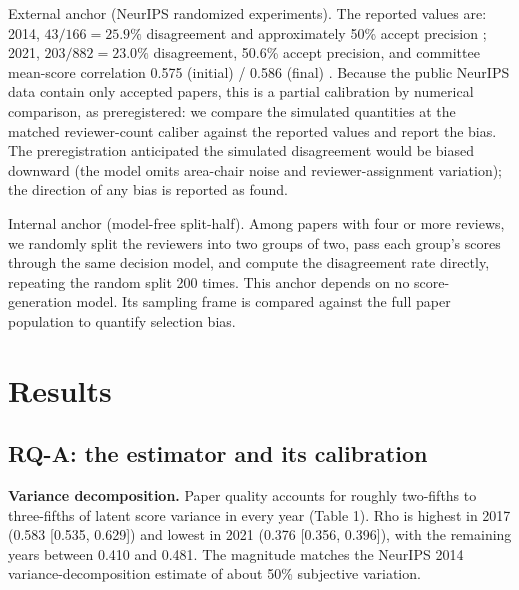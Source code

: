 \documentclass[10pt]{article}
\begin{document}
External anchor (NeurIPS randomized experiments). The reported values are: 2014, $43/166 = 25.9\%$ disagreement and approximately 50\% accept precision \citep{cortes2021}; 2021, $203/882 = 23.0\%$ disagreement, 50.6\% accept precision, and committee mean-score correlation 0.575 (initial) / 0.586 (final) \citep{beygelzimer2023}. Because the public NeurIPS data contain only accepted papers, this is a partial calibration by numerical comparison, as preregistered: we compare the simulated quantities at the matched reviewer-count caliber against the reported values and report the bias. The preregistration anticipated the simulated disagreement would be biased downward (the model omits area-chair noise and reviewer-assignment variation); the direction of any bias is reported as found.

Internal anchor (model-free split-half). Among papers with four or more reviews, we randomly split the reviewers into two groups of two, pass each group's scores through the same decision model, and compute the disagreement rate directly, repeating the random split 200 times. This anchor depends on no score-generation model. Its sampling frame is compared against the full paper population to quantify selection bias.

\section{Results}

\subsection{RQ-A: the estimator and its calibration}

\textbf{Variance decomposition.} Paper quality accounts for roughly two-fifths to three-fifths of latent score variance in every year (Table 1). Rho is highest in 2017 (0.583 [0.535, 0.629]) and lowest in 2021 (0.376 [0.356, 0.396]), with the remaining years between 0.410 and 0.481. The magnitude matches the NeurIPS 2014 variance-decomposition estimate of about 50\% subjective variation.
\end{document}
